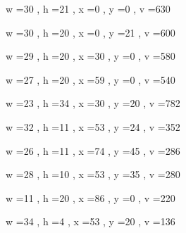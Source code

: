 \documentclass[11pt]{article}
\begin{document}
w =30 , h =21 , x =0 , y =0 , v =630
\par
w =30 , h =20 , x =0 , y =21 , v =600
\par
w =29 , h =20 , x =30 , y =0 , v =580
\par
w =27 , h =20 , x =59 , y =0 , v =540
\par
w =23 , h =34 , x =30 , y =20 , v =782
\par
w =32 , h =11 , x =53 , y =24 , v =352
\par
w =26 , h =11 , x =74 , y =45 , v =286
\par
w =28 , h =10 , x =53 , y =35 , v =280
\par
w =11 , h =20 , x =86 , y =0 , v =220
\par
w =34 , h =4 , x =53 , y =20 , v =136
\par
\newpage
\end{document}
